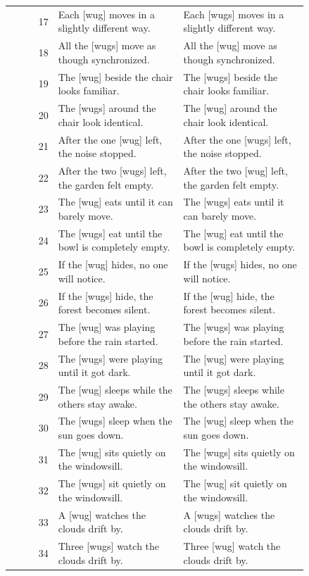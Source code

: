 \begin{table}[p]
\begin{tabular}{@{}rp{0.42\linewidth}p{0.42\linewidth}@{}}
17 & Each {[}wug{]} moves in a slightly different way. & Each {[}wugs{]} moves in a slightly different way. \\
18 & All the {[}wugs{]} move as though synchronized. & All the {[}wug{]} move as though synchronized. \\
19 & The {[}wug{]} beside the chair looks familiar. & The {[}wugs{]} beside the chair looks familiar. \\
20 & The {[}wugs{]} around the chair look identical. & The {[}wug{]} around the chair look identical. \\
21 & After the one {[}wug{]} left, the noise stopped. & After the one {[}wugs{]} left, the noise stopped. \\
22 & After the two {[}wugs{]} left, the garden felt empty. & After the two {[}wug{]} left, the garden felt empty. \\
23 & The {[}wug{]} eats until it can barely move. & The {[}wugs{]} eats until it can barely move. \\
24 & The {[}wugs{]} eat until the bowl is completely empty. & The {[}wug{]} eat until the bowl is completely empty. \\
25 & If the {[}wug{]} hides, no one will notice. & If the {[}wugs{]} hides, no one will notice. \\
26 & If the {[}wugs{]} hide, the forest becomes silent. & If the {[}wug{]} hide, the forest becomes silent. \\
27 & The {[}wug{]} was playing before the rain started. & The {[}wugs{]} was playing before the rain started. \\
28 & The {[}wugs{]} were playing until it got dark. & The {[}wug{]} were playing until it got dark. \\
29 & The {[}wug{]} sleeps while the others stay awake. & The {[}wugs{]} sleeps while the others stay awake. \\
30 & The {[}wugs{]} sleep when the sun goes down. & The {[}wug{]} sleep when the sun goes down. \\
31 & The {[}wug{]} sits quietly on the windowsill. & The {[}wugs{]} sits quietly on the windowsill. \\
32 & The {[}wugs{]} sit quietly on the windowsill. & The {[}wug{]} sit quietly on the windowsill. \\
33 & A {[}wug{]} watches the clouds drift by. & A {[}wugs{]} watches the clouds drift by. \\
34 & Three {[}wugs{]} watch the clouds drift by. & Three {[}wug{]} watch the clouds drift by. \\

\end{tabular}
\end{table}
